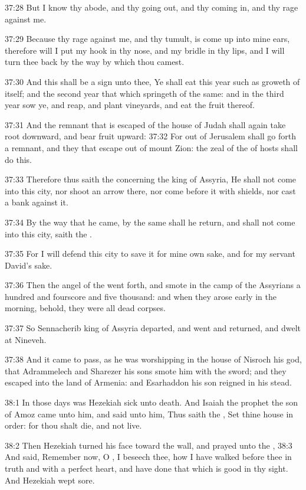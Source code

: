 37:28 But I know thy abode, and thy going out, and thy coming in, and thy rage against me.

37:29 Because thy rage against me, and thy tumult, is come up into mine ears, therefore will I put my hook in thy nose, and my bridle in thy lips, and I will turn thee back by the way by which thou camest.

37:30 And this shall be a sign unto thee, Ye shall eat this year such as groweth of itself; and the second year that which springeth of the same: and in the third year sow ye, and reap, and plant vineyards, and eat the fruit thereof.

37:31 And the remnant that is escaped of the house of Judah shall again take root downward, and bear fruit upward: 37:32 For out of Jerusalem shall go forth a remnant, and they that escape out of mount Zion: the zeal of the \LORD of hosts shall do this.

37:33 Therefore thus saith the \LORD concerning the king of Assyria, He shall not come into this city, nor shoot an arrow there, nor come before it with shields, nor cast a bank against it.

37:34 By the way that he came, by the same shall he return, and shall not come into this city, saith the \LORD.

37:35 For I will defend this city to save it for mine own sake, and for my servant David's sake.

37:36 Then the angel of the \LORD went forth, and smote in the camp of the Assyrians a hundred and fourscore and five thousand: and when they arose early in the morning, behold, they were all dead corpses.

37:37 So Sennacherib king of Assyria departed, and went and returned, and dwelt at Nineveh.

37:38 And it came to pass, as he was worshipping in the house of Nisroch his god, that Adrammelech and Sharezer his sons smote him with the sword; and they escaped into the land of Armenia: and Esarhaddon his son reigned in his stead.

38:1 In those days was Hezekiah sick unto death. And Isaiah the prophet the son of Amoz came unto him, and said unto him, Thus saith the \LORD, Set thine house in order: for thou shalt die, and not live.

38:2 Then Hezekiah turned his face toward the wall, and prayed unto the \LORD, 38:3 And said, Remember now, O \LORD, I beseech thee, how I have walked before thee in truth and with a perfect heart, and have done that which is good in thy sight. And Hezekiah wept sore.

